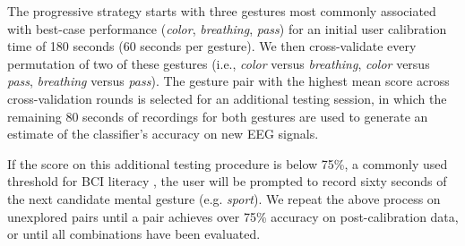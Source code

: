 The progressive strategy starts with three gestures most commonly associated with best-case performance (\textit{color}, \textit{breathing}, \textit{pass}) for an initial user calibration time of 180 seconds (60 seconds per gesture). We then cross-validate every permutation of two of these gestures (i.e., \textit{color} versus \textit{breathing}, \textit{color} versus \textit{pass}, \textit{breathing} versus \textit{pass}). The gesture pair with the highest mean score across cross-validation rounds is selected for an additional testing session, in which the remaining 80 seconds of recordings for both gestures are used to generate an estimate of the classifier's accuracy on new EEG signals.

If the score on this additional testing procedure is below 75\%, a commonly used threshold for BCI literacy \cite{vidaurre_towards_2010}, the user will be prompted to record sixty seconds of the next candidate mental gesture (e.g. \textit{sport}). We repeat the above process on unexplored pairs until a pair achieves over 75\% accuracy on post-calibration data, or until all combinations have been evaluated.

